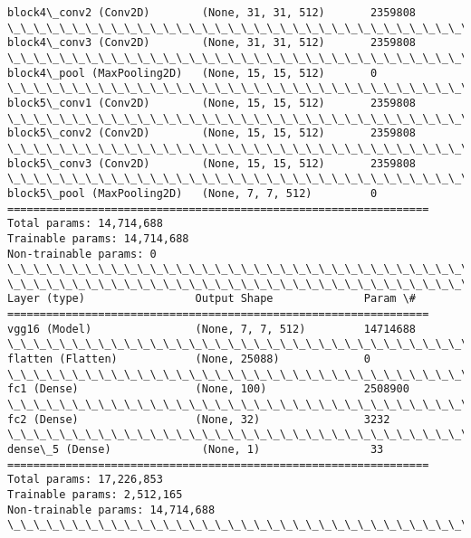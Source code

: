 \documentclass[11pt]{article}
\begin{document}
\begin{Verbatim}[commandchars=\\\{\},fontsize=\footnotesize]
block4\_conv2 (Conv2D)        (None, 31, 31, 512)       2359808
\_\_\_\_\_\_\_\_\_\_\_\_\_\_\_\_\_\_\_\_\_\_\_\_\_\_\_\_\_\_\_\_\_\_\_\_\_\_\_\_\_\_\_\_\_\_\_\_\_\_\_\_\_\_\_\_\_\_\_\_\_\_\_\_\_
block4\_conv3 (Conv2D)        (None, 31, 31, 512)       2359808
\_\_\_\_\_\_\_\_\_\_\_\_\_\_\_\_\_\_\_\_\_\_\_\_\_\_\_\_\_\_\_\_\_\_\_\_\_\_\_\_\_\_\_\_\_\_\_\_\_\_\_\_\_\_\_\_\_\_\_\_\_\_\_\_\_
block4\_pool (MaxPooling2D)   (None, 15, 15, 512)       0
\_\_\_\_\_\_\_\_\_\_\_\_\_\_\_\_\_\_\_\_\_\_\_\_\_\_\_\_\_\_\_\_\_\_\_\_\_\_\_\_\_\_\_\_\_\_\_\_\_\_\_\_\_\_\_\_\_\_\_\_\_\_\_\_\_
block5\_conv1 (Conv2D)        (None, 15, 15, 512)       2359808
\_\_\_\_\_\_\_\_\_\_\_\_\_\_\_\_\_\_\_\_\_\_\_\_\_\_\_\_\_\_\_\_\_\_\_\_\_\_\_\_\_\_\_\_\_\_\_\_\_\_\_\_\_\_\_\_\_\_\_\_\_\_\_\_\_
block5\_conv2 (Conv2D)        (None, 15, 15, 512)       2359808
\_\_\_\_\_\_\_\_\_\_\_\_\_\_\_\_\_\_\_\_\_\_\_\_\_\_\_\_\_\_\_\_\_\_\_\_\_\_\_\_\_\_\_\_\_\_\_\_\_\_\_\_\_\_\_\_\_\_\_\_\_\_\_\_\_
block5\_conv3 (Conv2D)        (None, 15, 15, 512)       2359808
\_\_\_\_\_\_\_\_\_\_\_\_\_\_\_\_\_\_\_\_\_\_\_\_\_\_\_\_\_\_\_\_\_\_\_\_\_\_\_\_\_\_\_\_\_\_\_\_\_\_\_\_\_\_\_\_\_\_\_\_\_\_\_\_\_
block5\_pool (MaxPooling2D)   (None, 7, 7, 512)         0
=================================================================
Total params: 14,714,688
Trainable params: 14,714,688
Non-trainable params: 0
\_\_\_\_\_\_\_\_\_\_\_\_\_\_\_\_\_\_\_\_\_\_\_\_\_\_\_\_\_\_\_\_\_\_\_\_\_\_\_\_\_\_\_\_\_\_\_\_\_\_\_\_\_\_\_\_\_\_\_\_\_\_\_\_\_
\_\_\_\_\_\_\_\_\_\_\_\_\_\_\_\_\_\_\_\_\_\_\_\_\_\_\_\_\_\_\_\_\_\_\_\_\_\_\_\_\_\_\_\_\_\_\_\_\_\_\_\_\_\_\_\_\_\_\_\_\_\_\_\_\_
Layer (type)                 Output Shape              Param \#
=================================================================
vgg16 (Model)                (None, 7, 7, 512)         14714688
\_\_\_\_\_\_\_\_\_\_\_\_\_\_\_\_\_\_\_\_\_\_\_\_\_\_\_\_\_\_\_\_\_\_\_\_\_\_\_\_\_\_\_\_\_\_\_\_\_\_\_\_\_\_\_\_\_\_\_\_\_\_\_\_\_
flatten (Flatten)            (None, 25088)             0
\_\_\_\_\_\_\_\_\_\_\_\_\_\_\_\_\_\_\_\_\_\_\_\_\_\_\_\_\_\_\_\_\_\_\_\_\_\_\_\_\_\_\_\_\_\_\_\_\_\_\_\_\_\_\_\_\_\_\_\_\_\_\_\_\_
fc1 (Dense)                  (None, 100)               2508900
\_\_\_\_\_\_\_\_\_\_\_\_\_\_\_\_\_\_\_\_\_\_\_\_\_\_\_\_\_\_\_\_\_\_\_\_\_\_\_\_\_\_\_\_\_\_\_\_\_\_\_\_\_\_\_\_\_\_\_\_\_\_\_\_\_
fc2 (Dense)                  (None, 32)                3232
\_\_\_\_\_\_\_\_\_\_\_\_\_\_\_\_\_\_\_\_\_\_\_\_\_\_\_\_\_\_\_\_\_\_\_\_\_\_\_\_\_\_\_\_\_\_\_\_\_\_\_\_\_\_\_\_\_\_\_\_\_\_\_\_\_
dense\_5 (Dense)              (None, 1)                 33
=================================================================
Total params: 17,226,853
Trainable params: 2,512,165
Non-trainable params: 14,714,688
\_\_\_\_\_\_\_\_\_\_\_\_\_\_\_\_\_\_\_\_\_\_\_\_\_\_\_\_\_\_\_\_\_\_\_\_\_\_\_\_\_\_\_\_\_\_\_\_\_\_\_\_\_\_\_\_\_\_\_\_\_\_\_\_\_

    \end{Verbatim}
\end{document}
